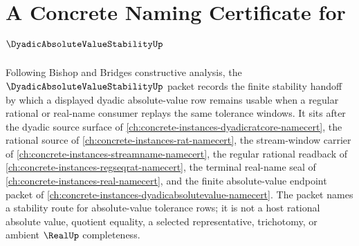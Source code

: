 \chapter{A Concrete Naming Certificate for $\DyadicAbsoluteValueStabilityUp$}
\label{ch:concrete-instances-dyadic-absolute-value-stability-namecert}

Following Bishop and Bridges constructive analysis, the $\DyadicAbsoluteValueStabilityUp$ packet records the finite stability handoff by which a displayed dyadic absolute-value row remains usable when a regular rational or real-name consumer replays the same tolerance windows. It sits after the dyadic source surface of \autoref{ch:concrete-instances-dyadicratcore-namecert}, the rational source of \autoref{ch:concrete-instances-rat-namecert}, the stream-window carrier of \autoref{ch:concrete-instances-streamname-namecert}, the regular rational readback of \autoref{ch:concrete-instances-regseqrat-namecert}, the terminal real-name seal of \autoref{ch:concrete-instances-real-namecert}, and the finite absolute-value endpoint packet of \autoref{ch:concrete-instances-dyadicabsolutevalue-namecert}. The packet names a stability route for absolute-value tolerance rows; it is not a host rational absolute value, quotient equality, a selected representative, trichotomy, or ambient $\RealUp$ completeness.

